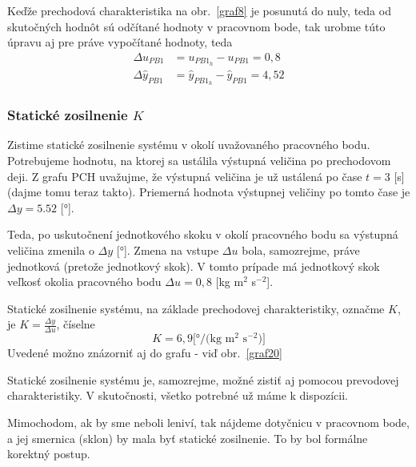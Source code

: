 \documentclass[a4paper, 10pt, ]{article}
\begin{document}
Keďže prechodová charakteristika na obr.~\ref{graf8} je posunutá do nuly, teda od skutočných hodnôt sú odčítané hodnoty v pracovnom bode, tak urobme túto úpravu aj pre práve vypočítané hodnoty, teda
\begin{align}
    \Delta u_{PB1} &= u_{PB1_h} - u_{PB1} = 0,8 \\
    \Delta \hat y_{PB1} &= \hat y_{PB1_h} -  \hat y_{PB1} = 4,52
\end{align}



\subsubsection{Statické zosilnenie $K$}

Zistime statické zosilnenie systému v okolí uvažovaného pracovného bodu. Potrebujeme hodnotu, na ktorej sa ustálila výstupná veličina po prechodovom deji. Z grafu PCH uvažujme, že výstupná veličina je už ustálená po čase $t=3$ [s] (dajme tomu teraz takto). Priemerná hodnota výstupnej veličiny po tomto čase je $\Delta y = 5.52$ [°].

Teda, po uskutočnení jednotkového skoku v okolí pracovného bodu sa výstupná veličina zmenila o $\Delta y$ [°]. Zmena na vstupe $\Delta u$ bola, samozrejme, práve jednotková (pretože jednotkový skok). V tomto prípade má jednotkový skok veľkosť okolia pracovného bodu  $\Delta u = 0,8$ [kg m$^2$ s$^{-2}$].

Statické zosilnenie systému, na základe prechodovej charakteristiky, označme $K$, je $K = \frac{\Delta y}{\Delta u}$, číselne
\begin{equation}
     K = 6,9 \text{[°/(kg m$^2$ s$^{-2}$)]}
\end{equation}
Uvedené možno znázorniť aj do grafu - viď obr.~\ref{graf20}



Statické zosilnenie systému je, samozrejme, možné zistiť aj pomocou prevodovej charakteristiky. V skutočnosti, všetko potrebné už máme k dispozícii.

Mimochodom, ak by sme neboli leniví, tak nájdeme dotyčnicu v pracovnom bode, a jej smernica (sklon) by mala byť statické zosilnenie. To by bol formálne korektný postup.
\end{document}

